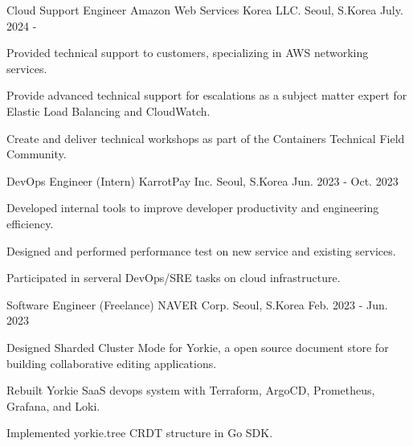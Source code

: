 

\begin{cventries}

\cventry
    {Cloud Support Engineer} %
    {Amazon Web Services Korea LLC.} %
    {Seoul, S.Korea} %
    {July. 2024 - } %
    {
      \begin{cvitems} %
        \item {Provided technical support to customers, specializing in AWS networking services.}
        \item {Provide advanced technical support for escalations as a subject matter expert for Elastic Load Balancing and CloudWatch.}
        \item {Create and deliver technical workshops as part of the Containers Technical Field Community.}
      \end{cvitems}
    }

\cventry
    {DevOps Engineer (Intern)} %
    {KarrotPay Inc.} %
    {Seoul, S.Korea} %
    {Jun. 2023 - Oct. 2023} %
    {
      \begin{cvitems} %
        \item {Developed internal tools to improve developer productivity and engineering efficiency.}
        \item {Designed and performed performance test on new service and existing services.}
        \item {Participated in serveral DevOps/SRE tasks on cloud infrastructure.}
      \end{cvitems}
    }

  \cventry
    {Software Engineer (Freelance)} %
    {NAVER Corp.} %
    {Seoul, S.Korea} %
    {Feb. 2023 - Jun. 2023} %
    {
      \begin{cvitems} %
        \item {Designed Sharded Cluster Mode for Yorkie, a open source document store for building collaborative editing applications.}
        \item {Rebuilt Yorkie SaaS devops system with Terraform, ArgoCD, Prometheus, Grafana, and Loki.}
        \item {Implemented yorkie.tree CRDT structure in Go SDK.}
      \end{cvitems}
    }


\end{cventries}
